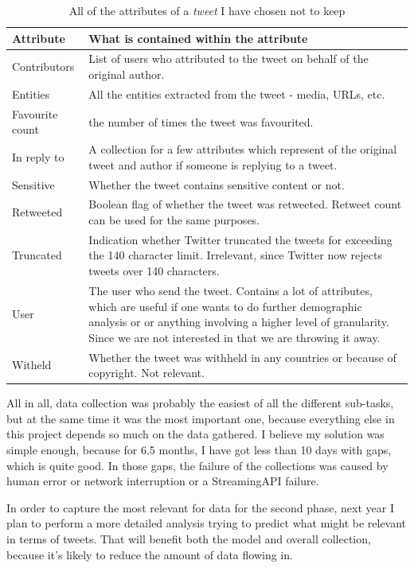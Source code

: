 \documentclass[minf,twoside,singlespacing,parskip,frontabs]{infthesis}
\begin{document}
\begin{table}[]
\begin{center}
\begin{tabular}{ l | p{11cm} }
\textbf{Attribute} & \textbf{What is contained within the attribute} \\
\hline
\hline
Contributors & List of users who attributed to the tweet on behalf of the original author.\\
\hline
Entities & All the entities extracted from the tweet - media, URLs, etc. \\
\hline
Favourite count & the number of times the tweet was favourited. \\
\hline
In reply to & A collection for a few attributes which represent of the original tweet and author if someone is replying to a tweet.  \\
\hline
Sensitive & Whether the tweet contains sensitive content or not. \\
\hline
Retweeted & Boolean flag of whether the tweet was retweeted. Retweet count can be used for the same purposes.  \\
\hline
Truncated &  Indication whether Twitter truncated the tweets for exceeding the 140 character limit. Irrelevant, since Twitter now rejects tweets over 140 characters.\\
\hline
User & The user who send the tweet. Contains a lot of attributes, which are useful if one wants to do further demographic analysis or or anything involving a higher level of granularity. Since we are not interested in that we are throwing it away.\\
\hline
Witheld & Whether the tweet was withheld in any countries or because of copyright. Not relevant. \\
\end{tabular}
\end{center}
\caption{All of the attributes of a \emph{tweet} I have chosen not to keep }
\end{table}


All in all, data collection was probably the easiest of all the different sub-tasks, but at the same time it was the most important one, because everything else in this project depends so much on the data gathered. I believe my solution was simple enough, because for 6.5 months, I have got less than 10 days with gaps, which is quite good. In those gaps, the failure of the collections was caused by human error or network interruption or a StreamingAPI failure. 


In order to capture the most relevant for data for the second phase, next year I plan to perform a more detailed analysis trying to predict what might be relevant in terms of tweets. That will benefit both the model and overall collection, because it's likely to reduce the amount of data flowing in. 
\end{document}
